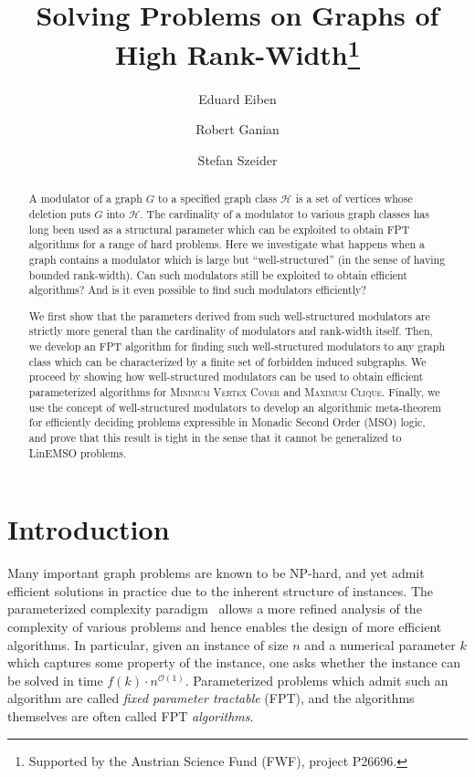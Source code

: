 \documentclass{llncs}
\newcommand{\bigoh}{\mathcal{O}}
\def\HH{{\mathcal H}}
\begin{document}
\title{Solving Problems on Graphs of High Rank-Width\thanks{Supported by the Austrian Science Fund (FWF), project P26696.}}

\author{Eduard Eiben \and Robert Ganian \and Stefan Szeider}




\maketitle


\begin{abstract}
\noindent A modulator of a graph $G$ to a specified graph class $\HH$ is a set of vertices whose deletion puts $G$ into $\HH$. The cardinality of a modulator to various graph classes has long been used as a structural parameter which can be exploited to obtain FPT algorithms for a range of hard problems.
  Here we investigate what happens when a graph contains a modulator which is large but ``well-structured'' (in the sense of having bounded rank-width). Can such modulators still be exploited to obtain efficient algorithms? And is it even possible to find such modulators efficiently?
  
  We first show that the parameters derived from such well-structured modulators are strictly more general than the cardinality of modulators and rank-width itself. Then, we develop an FPT algorithm for finding such well-structured modulators to any graph class which can be characterized by a finite set of forbidden induced subgraphs. We proceed by showing how well-structured modulators can be used to obtain efficient parameterized algorithms for \textsc{Minimum Vertex Cover} and \textsc{Maximum Clique}. Finally, we use the concept of well-structured modulators to develop an algorithmic meta-theorem for efficiently deciding problems expressible in Monadic Second Order (MSO) logic, and prove that this result is tight in the sense that it cannot be generalized to LinEMSO problems.
\end{abstract}



\section{Introduction}

Many important graph problems are known to be NP-hard, and yet admit efficient solutions in practice due to the inherent structure of instances. The parameterized complexity paradigm~\cite{DowneyFellows13,Niedermeier06} allows a more refined analysis of the complexity of various problems and hence enables the design of more efficient algorithms. In particular, given an instance of size $n$ and a numerical parameter $k$ which captures some property of the instance, one asks whether the instance can be solved in time $f(k)\cdot n^{\bigoh(1)}$. Parameterized problems which admit such an algorithm are called \emph{fixed parameter tractable} (FPT), and the algorithms themselves are often called FPT \emph{algorithms}.
\end{document}
